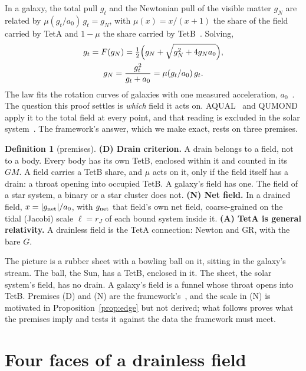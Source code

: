 \documentclass[twocolumn]{iopjournal}
\theoremstyle{definition}
\newtheorem{definition}{Definition}
\theoremstyle{remark}
\begin{document}
In a galaxy, the total pull $g_t$ and the Newtonian pull of the visible
matter $g_N$ are related by $\mu(g_t/a_0)\,g_t = g_N$, with
$\mu(x) = x/(x+1)$ the share of the field carried by TetA and $1 - \mu$
the share carried by TetB~\cite{NelsonL2,NelsonL3,NelsonTug}. Solving,
\begin{gather}
  g_t = F(g_N) = \tfrac12\Bigl(g_N + \sqrt{g_N^2 + 4 g_N a_0}\Bigr),
  \label{eq:F}\\
  g_N = \frac{g_t^2}{g_t + a_0} = \mu(g_t/a_0)\,g_t. \nonumber
\end{gather}
The law fits the rotation curves of galaxies with one measured
acceleration, $a_0$~\cite{Milgrom1983,SPARC}. The question this proof settles is
\emph{which} field it acts on. AQUAL~\cite{BM1984} and
QUMOND~\cite{Milgrom2010} apply it to the total field at every point,
and that reading is excluded in the solar
system~\cite{Hees2014,Hees2016}. The framework's answer, which we make
exact, rests on three premises.

\begin{definition}[premises]
\textbf{(D) Drain criterion.} A drain belongs to a field, not to a
body. Every body has its own TetB, enclosed within it and counted in its
$GM$. A field carries a TetB share, and $\mu$ acts on it, only if the
field itself has a drain: a throat opening into occupied TetB. A
galaxy's field has one. The field of a star system, a binary or a star
cluster does not.
\textbf{(N) Net field.} In a drained field, $x = |g_{\rm net}|/a_0$, with
$g_{\rm net}$ that field's own net field, coarse-grained on the tidal
(Jacobi) scale $\ell = r_J$ of each bound system inside it.
\textbf{(A) TetA is general relativity.} A drainless field is the TetA
connection: Newton and GR, with the bare $G$.
\end{definition}

The picture is a rubber sheet with a bowling ball on it, sitting in the
galaxy's stream. The ball, the Sun, has a TetB, enclosed in it. The
sheet, the solar system's field, has no drain. A galaxy's field is a
funnel whose throat opens into TetB. Premises (D) and (N) are the
framework's~\cite{NelsonEinstein,NelsonBimetric}, and the scale in (N)
is motivated in Proposition~\ref{prop:edge} but not derived; what
follows proves what the premises imply and tests it against the data
the framework must meet.

\section*{Four faces of a drainless field}
\end{document}

